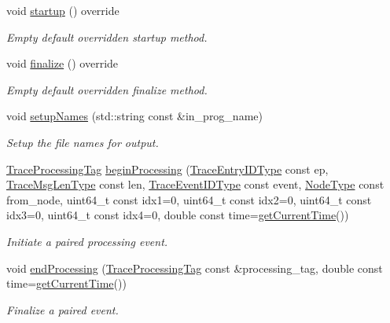\begin{DoxyCompactItemize}
void \hyperlink{structvt_1_1trace_1_1_trace_a5dd8767d9020ebeaba49ea3a684738a1}{startup} () override
\begin{DoxyCompactList}\small\item\em Empty default overridden startup method. \end{DoxyCompactList}\item 
void \hyperlink{structvt_1_1trace_1_1_trace_a571333fa708843b1b24079eccfc3ba93}{finalize} () override
\begin{DoxyCompactList}\small\item\em Empty default overridden finalize method. \end{DoxyCompactList}\item 
void \hyperlink{structvt_1_1trace_1_1_trace_a52cc4e12a7159cf21d8893b961834af8}{setup\+Names} (std\+::string const \&in\+\_\+prog\+\_\+name)
\begin{DoxyCompactList}\small\item\em Setup the file names for output. \end{DoxyCompactList}\item 
\hyperlink{structvt_1_1trace_1_1_trace_processing_tag}{Trace\+Processing\+Tag} \hyperlink{structvt_1_1trace_1_1_trace_a8f1a745228757b9d2ece4cd226d9540c}{begin\+Processing} (\hyperlink{namespacevt_1_1trace_a3c14050715ba9eceaeff51fb3de64f2f}{Trace\+Entry\+I\+D\+Type} const ep, \hyperlink{namespacevt_1_1trace_aeb598f45d67d41db7902e494f2f0ce59}{Trace\+Msg\+Len\+Type} const len, \hyperlink{namespacevt_1_1trace_a64a7185f3e102df8d8258f263ccd1582}{Trace\+Event\+I\+D\+Type} const event, \hyperlink{namespacevt_a866da9d0efc19c0a1ce79e9e492f47e2}{Node\+Type} const from\+\_\+node, uint64\+\_\+t const idx1=0, uint64\+\_\+t const idx2=0, uint64\+\_\+t const idx3=0, uint64\+\_\+t const idx4=0, double const time=\hyperlink{structvt_1_1trace_1_1_trace_a04cf6b76b4ced1bc90d246a34c948db5}{get\+Current\+Time}())
\begin{DoxyCompactList}\small\item\em Initiate a paired processing event. \end{DoxyCompactList}\item 
void \hyperlink{structvt_1_1trace_1_1_trace_a18f66e844acc133fce37c2c9d9f939e0}{end\+Processing} (\hyperlink{structvt_1_1trace_1_1_trace_processing_tag}{Trace\+Processing\+Tag} const \&processing\+\_\+tag, double const time=\hyperlink{structvt_1_1trace_1_1_trace_a04cf6b76b4ced1bc90d246a34c948db5}{get\+Current\+Time}())
\begin{DoxyCompactList}\small\item\em Finalize a paired event. \end{DoxyCompactList}\item 

\end{DoxyCompactItemize}
